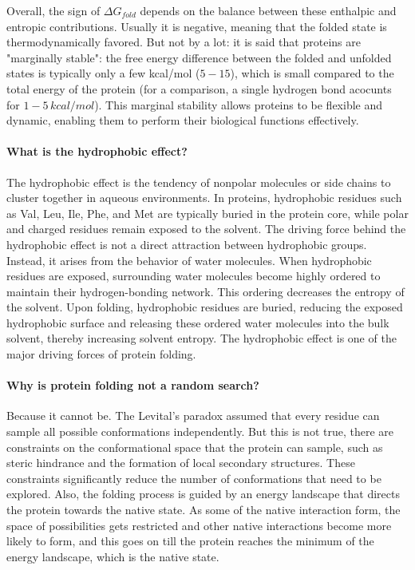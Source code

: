 Overall, the sign of $\Delta G_{fold}$ depends on the balance between these enthalpic and entropic contributions. Usually it is negative, meaning that the folded state is thermodynamically favored. But not by a lot: it is said that proteins are "marginally stable": the free energy difference between the folded and unfolded states is typically only a few kcal/mol ($5-15$), which is 
small compared to the total energy of the protein (for a comparison, a single hydrogen bond acocunts for $1-5\, kcal/mol$). This marginal stability allows proteins to be flexible and dynamic, enabling them to perform their biological functions effectively.


\paragraph{What is the hydrophobic effect?}
The hydrophobic effect is the tendency of nonpolar molecules or side chains to cluster together in aqueous environments. In proteins, hydrophobic residues such as Val, Leu, Ile, Phe, and Met are typically buried in the protein core, while polar and charged residues remain exposed to the solvent.
The driving force behind the hydrophobic effect is not a direct attraction between hydrophobic groups. Instead, it arises from the behavior of water molecules. When hydrophobic residues are exposed, surrounding water molecules become highly ordered to maintain their hydrogen-bonding network. This ordering decreases the entropy of the solvent. Upon folding, hydrophobic residues are buried, reducing the exposed hydrophobic surface and releasing these ordered water molecules into the bulk solvent, thereby increasing solvent entropy.
The hydrophobic effect is one of the major driving forces of protein folding. 


\paragraph{Why is protein folding not a random search?}
Because it cannot be. The Levital's paradox assumed that every residue can sample all possible conformations independently. But this is not true, there are constraints on the conformational space that the protein can sample, such as steric hindrance and the formation of local secondary structures. These constraints significantly reduce the number of conformations that need to be explored.
Also, the folding process is guided by an energy landscape that directs the protein towards the native state. As some of the native interaction form, the space of possibilities gets restricted and 
other native interactions become more likely to form, and this goes on till the protein reaches the minimum of the energy landscape, which is the native state. 





